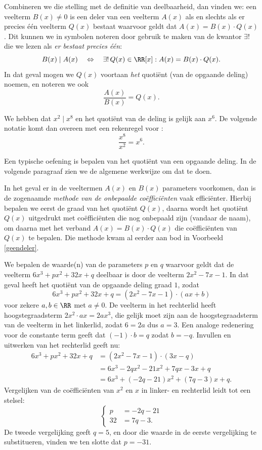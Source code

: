 \documentclass{ximera}
\begin{document}
Combineren we die stelling met de definitie van deelbaarheid, dan vinden we: een veelterm $B(x) \neq 0$ is een deler van een veelterm $A(x)$ als en slechts als er precies \'e\'en veelterm $Q(x)$ bestaat waarvoor geldt dat $A(x) = B(x)\cdot Q(x)$. Dit kunnen we in symbolen noteren door gebruik te maken van de kwantor $\exists!$ die we lezen als {\em er bestaat precies \'e\'en}:
\[
B(x) \mid A(x) \quad \Leftrightarrow \quad \exists! \, Q(x) \in \RR[x]: A(x) = B(x)\cdot Q(x).
\] 
In dat geval mogen we $Q(x)$ voortaan {\em het} quoti\"ent (van de opgaande deling) noemen, en noteren we ook 
\[
\frac{A(x)}{B(x)} = Q(x).
\]

\begin{example}
We hebben dat $x^2 \mid x^8$ en het quoti\"ent van de deling is gelijk aan $x^6$. De volgende notatie komt dan overeen met een rekenregel voor :
\[
\frac{x^8}{x^2} = x^6.
\]
\end{example}


Een typische oefening is bepalen van het quoti\"ent van een opgaande deling. In de volgende paragraaf zien we de algemene werkwijze om dat te doen. 

In het geval er in de veeltermen $A(x)$ en $B(x)$ parameters voorkomen, dan is de zogenaamde {\em methode van de onbepaalde co\"effici\"enten} vaak effici\"enter. Hierbij bepalen we eerst de graad van het quoti\"ent $Q(x)$, daarna wordt het quoti\"ent $Q(x)$ uitgedrukt met co\"effici\"enten die nog onbepaald zijn (vandaar de naam), om daarna met het verband $A(x) = B(x) \cdot Q(x)$ die co\"effici\"enten van $Q(x)$ te bepalen. Die methode kwam al eerder aan bod in Voorbeeld \ref{geendeler}. 

\begin{example}
We bepalen de waarde(n) van de parameters $p$ en $q$ waarvoor geldt dat de veelterm $6x^3+px^2+32x+q$ deelbaar is door de veelterm $2x^2-7x-1$. In dat geval heeft het quoti\"ent van de opgaande deling graad $1$, zodat 
\[
6x^3+px^2+32x+q = (2x^2-7x-1)\cdot (ax+b)
\]
voor zekere $a,b \in \RR$ met $a \neq 0$. De veelterm in het rechterlid heeft hoogstegraadsterm $2x^2 \cdot ax = 2ax^3$, die gelijk moet zijn aan de hoogstegraadsterm van de veelterm in het linkerlid, zodat $6 = 2a$ dus $a = 3$. Een analoge redenering voor de constante term geeft dat $(-1) \cdot b = q$ zodat $b = -q$. Invullen en uitwerken van het rechterlid geeft nu:
\begin{align*}
6x^3+px^2+32x+q 
& = (2x^2-7x-1)\cdot (3x-q) \\
& = 6x^3 - 2qx^2 - 21x^2 + 7qx - 3x + q \\
& = 6x^3 + (-2q-21)x^2 + (7q-3)x+q.
\end{align*}
Vergelijken van de co\"effici\"enten van $x^2$ en $x$ in linker- en rechterlid leidt tot een stelsel:
\[
\left\{ 
\begin{aligned}
p & = -2q - 21 \\
32 & = 7q - 3. 
\end{aligned}
\right.
\]
De tweede vergelijking geeft $q = 5$, en door die waarde in de eerste vergelijking te substitueren, vinden we ten slotte dat $p = -31$.  
\end{example}
\end{document}

